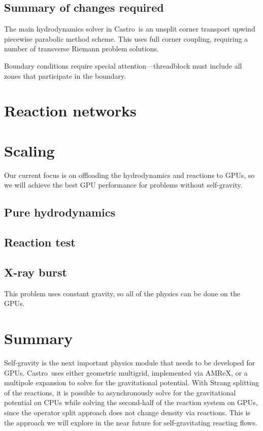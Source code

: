 \documentclass[twocolumn,times]{aastex62}
\newcommand{\castro}{{\sf Castro}}
\begin{document}
\subsection{Summary of changes required}

The main hydrodynamics solver in \castro\ is an unsplit corner
transport upwind \citep{ppmunsplit} piecewise parabolic method
\citep{ppm} scheme.  This uses full corner coupling, requiring a
number of transverse Riemann problem solutions.


Boundary conditions require special attention---threadblock must include
all zones that participate in the boundary.

\section{Reaction networks}

\section{Scaling}

Our current focus is on offloading the hydrodynamics and reactions to
GPUs, so we will achieve the best GPU performance for problems without
self-gravity.

\subsection{Pure hydrodynamics}

\subsection{Reaction test}

\subsection{X-ray burst}

This problem uses constant gravity, so all of the physics can be done on the GPUs.


\section{Summary}

Self-gravity is the next important physics module that needs to be
developed for GPUs.  \castro\ uses either geometric multigrid,
implemented via AMReX, or a multipole expansion to solve for the
gravitational potential.  With Strang splitting of the reactions, it
is possible to asynchronously solve for the gravitational potential on
CPUs while solving the second-half of the reaction system on GPUs,
since the operator split approach does not change density via
reactions.  This is the approach we will explore in the near future
for self-gravitating reacting flows.
\end{document}
